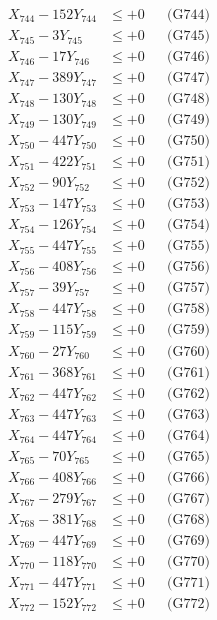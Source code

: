 \documentclass[a4paper,10pt]{article}
\begin{document}
{\begin{align}
X_{744} - 152Y_{744} &\leq +0 && \text{(G744)} \\
X_{745} - 3Y_{745} &\leq +0 && \text{(G745)} \\
X_{746} - 17Y_{746} &\leq +0 && \text{(G746)} \\
X_{747} - 389Y_{747} &\leq +0 && \text{(G747)} \\
X_{748} - 130Y_{748} &\leq +0 && \text{(G748)} \\
X_{749} - 130Y_{749} &\leq +0 && \text{(G749)} \\
X_{750} - 447Y_{750} &\leq +0 && \text{(G750)} \\
\allowbreak
X_{751} - 422Y_{751} &\leq +0 && \text{(G751)} \\
X_{752} - 90Y_{752} &\leq +0 && \text{(G752)} \\
X_{753} - 147Y_{753} &\leq +0 && \text{(G753)} \\
X_{754} - 126Y_{754} &\leq +0 && \text{(G754)} \\
X_{755} - 447Y_{755} &\leq +0 && \text{(G755)} \\
X_{756} - 408Y_{756} &\leq +0 && \text{(G756)} \\
X_{757} - 39Y_{757} &\leq +0 && \text{(G757)} \\
X_{758} - 447Y_{758} &\leq +0 && \text{(G758)} \\
X_{759} - 115Y_{759} &\leq +0 && \text{(G759)} \\
X_{760} - 27Y_{760} &\leq +0 && \text{(G760)} \\
\allowbreak
X_{761} - 368Y_{761} &\leq +0 && \text{(G761)} \\
X_{762} - 447Y_{762} &\leq +0 && \text{(G762)} \\
X_{763} - 447Y_{763} &\leq +0 && \text{(G763)} \\
X_{764} - 447Y_{764} &\leq +0 && \text{(G764)} \\
X_{765} - 70Y_{765} &\leq +0 && \text{(G765)} \\
X_{766} - 408Y_{766} &\leq +0 && \text{(G766)} \\
X_{767} - 279Y_{767} &\leq +0 && \text{(G767)} \\
X_{768} - 381Y_{768} &\leq +0 && \text{(G768)} \\
X_{769} - 447Y_{769} &\leq +0 && \text{(G769)} \\
X_{770} - 118Y_{770} &\leq +0 && \text{(G770)} \\
\allowbreak
X_{771} - 447Y_{771} &\leq +0 && \text{(G771)} \\
X_{772} - 152Y_{772} &\leq +0 && \text{(G772)} \\

\end{align}}
\end{document}
